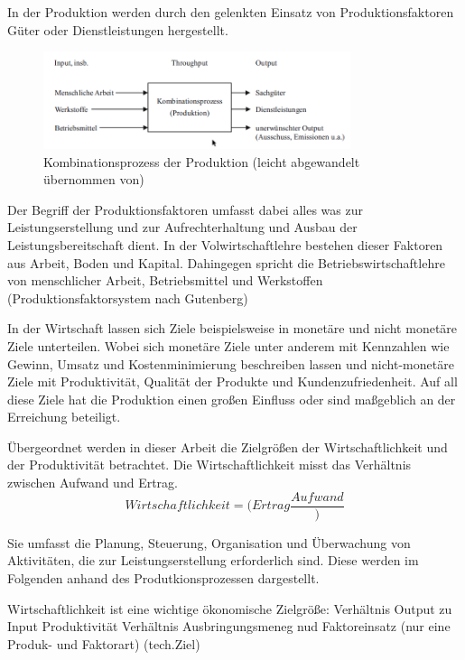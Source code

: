 \documentclass[a4paper,12pt, german]{report}
\begin{document}
In der Produktion werden durch den gelenkten Einsatz von Produktionsfaktoren Güter oder Dienstleistungen hergestellt. %

\begin{figure}[H]
  \center
 \includegraphics[width=9cm]{images/Kombinationsprozess.png}
  \caption[Kombinationsprozess der Produktion]{Kombinationsprozess der Produktion (leicht abgewandelt übernommen von) \cite{13}}
\end{figure}

Der Begriff der Produktionsfaktoren umfasst dabei alles was zur Leistungserstellung und zur Aufrechterhaltung und Ausbau der Leistungsbereitschaft dient. In der Volwirtschaftlehre bestehen dieser Faktoren aus Arbeit, Boden und Kapital. Dahingegen spricht die Betriebswirtschaftlehre von menschlicher Arbeit, Betriebsmittel und Werkstoffen (Produktionsfaktorsystem nach Gutenberg)

In der Wirtschaft lassen sich Ziele beispielsweise in monetäre und nicht monetäre Ziele unterteilen. Wobei sich monetäre Ziele unter anderem mit Kennzahlen wie Gewinn, Umsatz und Kostenminimierung beschreiben lassen und nicht-monetäre Ziele mit Produktivität, Qualität der Produkte und Kundenzufriedenheit. Auf all diese Ziele hat die Produktion einen großen Einfluss oder sind maßgeblich an der Erreichung beteiligt.

Übergeordnet werden in dieser Arbeit die Zielgrößen der Wirtschaftlichkeit und der Produktivität betrachtet. Die Wirtschaftlichkeit misst das Verhältnis zwischen Aufwand und Ertrag.
\begin{equation}
  Wirtschaftlichkeit =(Ertrag\frac{Aufwand})
\end{equation}


Sie umfasst die Planung, Steuerung, Organisation und Überwachung von Aktivitäten, die zur Leistungserstellung erforderlich sind. Diese werden im Folgenden anhand des Produtkionsprozessen dargestellt.



Wirtschaftlichkeit ist eine wichtige ökonomische Zielgröße: Verhältnis Output zu Input
Produktivität Verhältnis Ausbringungsmeneg nud Faktoreinsatz (nur eine Produk- und Faktorart) (tech.Ziel)
\end{document}
